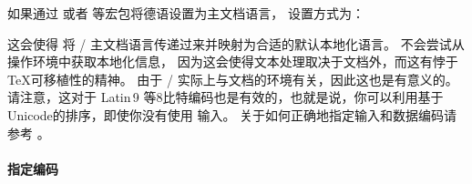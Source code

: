 \begin{ltxexample}
\usepackage[sortlocale=de]{biblatex}
\end{ltxexample}
%
如果通过  或者  等宏包将德语设置为主文档语言，
设置方式为：

\begin{ltxexample}
\usepackage[sortlocale=auto]{biblatex}
\end{ltxexample}
%
这会使得 \biblatex 将 / 主文档语言传递过来并映射为合适的默认本地化语言。
\biber 不会尝试从操作环境中获取本地化信息，
因为这会使得文本处理取决于文档外，而这有悖于 \TeX 可移植性的精神。
由于 /  实际上与文档的环境有关，因此这也是有意义的。
请注意，这对于  Latin\,9 等8比特编码也是有效的，也就是说，你可以利用基于Unicode的排序，即使你没有使用 \utf 输入。
关于如何正确地指定输入和数据编码请参考 。

\paragraph{指定编码}
\label{bib:cav:enc:enc}


